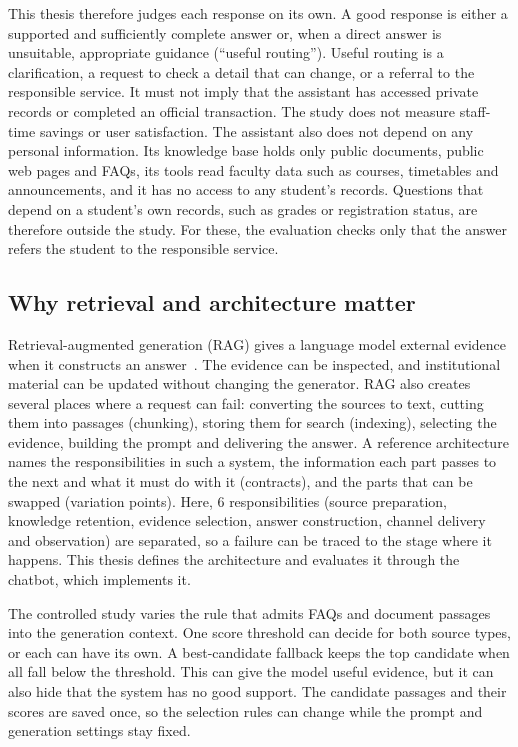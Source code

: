 This thesis therefore judges each response on its own. A good response is either a supported and sufficiently complete answer or, when a direct answer is unsuitable, appropriate guidance (``useful routing''). Useful routing is a clarification, a request to check a detail that can change, or a referral to the responsible service. It must not imply that the assistant has accessed private records or completed an official transaction. The study does not measure staff-time savings or user satisfaction. The assistant also does not depend on any personal information. Its knowledge base holds only public documents, public web pages and FAQs, its tools read faculty data such as courses, timetables and announcements, and it has no access to any student's records. Questions that depend on a student's own records, such as grades or registration status, are therefore outside the study. For these, the evaluation checks only that the answer refers the student to the responsible service.

\subsection{Why retrieval and architecture matter}

Retrieval-augmented generation (RAG) gives a language model external evidence when it constructs an answer~\cite{lewis2020rag}. The evidence can be inspected, and institutional material can be updated without changing the generator. RAG also creates several places where a request can fail: converting the sources to text, cutting them into passages (chunking), storing them for search (indexing), selecting the evidence, building the prompt and delivering the answer.
A reference architecture names the responsibilities in such a system, the information each part passes to the next and what it must do with it (contracts), and the parts that can be swapped (variation points). Here, 6 responsibilities (source preparation, knowledge retention, evidence selection, answer construction, channel delivery and observation) are separated, so a failure can be traced to the stage where it happens. This thesis defines the architecture and evaluates it through the chatbot, which implements it.

The controlled study varies the rule that admits FAQs and document passages into the generation context. One score threshold can decide for both source types, or each can have its own. A best-candidate fallback keeps the top candidate when all fall below the threshold. This can give the model useful evidence, but it can also hide that the system has no good support. The candidate passages and their scores are saved once, so the selection rules can change while the prompt and generation settings stay fixed.


